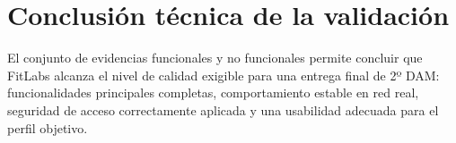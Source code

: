 \section{Conclusión técnica de la validación}

El conjunto de evidencias funcionales y no funcionales permite concluir que FitLabs alcanza el nivel de calidad exigible para una entrega final de 2º DAM: funcionalidades principales completas, comportamiento estable en red real, seguridad de acceso correctamente aplicada y una usabilidad adecuada para el perfil objetivo.
